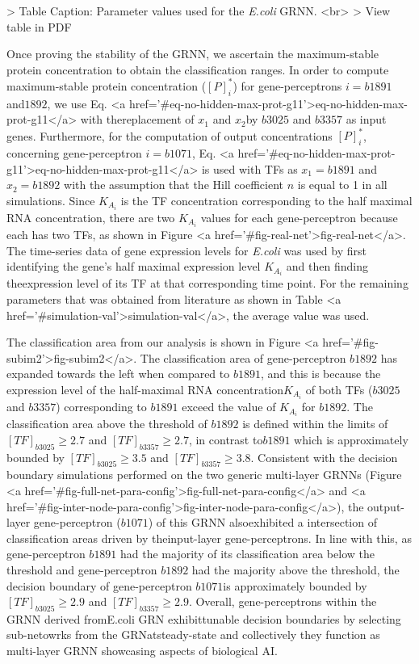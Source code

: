 \documentclass[twocolumn]{biophys-new}
\begin{document}
{{\begin{table}
> Table Caption: Parameter values used for the \emph{E.coli} GRNN. \vspace{0.5em}<br>
> View table in PDF
\end{table}
Once proving the stability of the GRNN, we ascertain the maximum-stable protein concentration to obtain the classification ranges.
In order to compute maximum-stable protein concentration ($[P]^*_i$) for gene-perceptrons $i=b1891$ and$1892 $, we use Eq. <a href='#eq-no-hidden-max-prot-g11'>eq-no-hidden-max-prot-g11</a> with thereplacement of $x_1$ and $x_2$by $b3025$ and $b3357$ as input genes. Furthermore, for the computation of output concentrations $[P]^*_i$, concerning gene-perceptron $i=b1071$, Eq. <a href='#eq-no-hidden-max-prot-g11'>eq-no-hidden-max-prot-g11</a> is used with TFs as $x_1=b1891$ and $x_2=b1892$ with the assumption that the Hill coefficient $n$ is equal to 1 in all simulations. Since $K_{A_i}$ is the TF concentration corresponding to the half maximal RNA concentration, there are two $K_{A_i}$ values for each gene-perceptron because each has two TFs, as shown in Figure <a href='#fig-real-net'>fig-real-net</a>. 
The time-series data of gene expression levels for \emph{E.coli} was used by first identifying the gene's half maximal expression level $K_{A_i}$ and then finding theexpression level of its TF at that corresponding time point. For the remaining parameters that was obtained from literature as shown in Table <a href='#simulation-val'>simulation-val</a>, the average value was used.



The classification area from our analysis is shown in Figure <a href='#fig-subim2'>fig-subim2</a>. The classification area of gene-perceptron $b1892$ has expanded towards the left when compared to $b1891$, and this is because the expression level of the half-maximal RNA concentration$K_{A_i}$ of both TFs ($b3025$ and $b3357$) corresponding to $b1891$ exceed the value of $K_{A_i}$ for $b1892$. 
The classification area above the threshold of $b1892$ is defined within the limits of $[TF]_{b3025} \geq 2.7 $ and $[TF]_{b3357} \geq 2.7 $, in contrast to$b1891$ which is approximately bounded by $[TF]_{b3025}\geq3.5$ and $[TF]_{b3357}\geq3.8 $.
Consistent with the decision boundary simulations performed on the two generic multi-layer GRNNs (Figure <a href='#fig-full-net-para-config'>fig-full-net-para-config</a> and <a href='#fig-inter-node-para-config'>fig-inter-node-para-config</a>), the output-layer gene-perceptron ($b1071$) of this GRNN alsoexhibited a intersection of classification areas driven by theinput-layer gene-perceptrons. In line with this, as gene-perceptron $b1891$ had the majority of its classification area below the threshold and gene-perceptron $b1892$ had the majority above the threshold, the decision boundary of gene-perceptron $b1071$is approximately bounded by $[TF]_{b3025} \geq 2.9$ and $[TF]_{b3357} \geq 2.9$. Overall, gene-perceptrons within the GRNN derived fromE.coli GRN exhibittunable decision boundaries by selecting sub-netowrks from the GRNatsteady-state and collectively they function as multi-layer GRNN showcasing aspects of biological AI. 




}}
\end{document}
